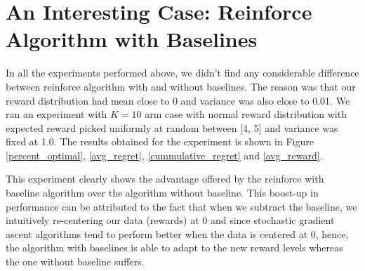 \documentclass{article}
\begin{document}
\section{An Interesting Case: Reinforce Algorithm with Baselines}
	\label{interesting_reinforce}
	In all the experiments performed above, we didn't find any considerable difference between reinforce algorithm with and without baselines. The reason was that
	our reward distribution had mean close to 0 and variance was also close to 0.01. We ran an experiment with $K=10$ arm case with normal reward distribution with
	expected reward picked uniformly at random between [4, 5] and variance was fixed at 1.0. The results obtained for the experiment is shown in Figure 
	\ref{percent_optimal}, \ref{avg_regret}, \ref{cummulative_regret} and \ref{avg_reward}.\par
	
	\noindent %
	
	This experiment clearly shows the advantage offered by the reinforce with baseline algorithm over the algorithm without baseline. This boost-up in performance
	can be attributed to the fact that when we subtract the baseline, we intuitively re-centering our data (rewards) at 0 and since stochastic gradient ascent algorithms
	tend to perform better when the data is centered at 0, hence, the algorithm with baselines is able to adapt to the new reward levels whereas the one without baseline
	suffers.
	
\end{document}
